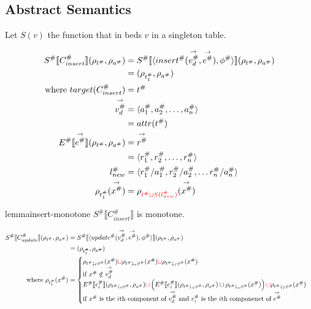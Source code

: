 \subsection{Abstract Semantics}

Let $S(v)$ the function that in beds $v$ in a singleton table.

\begin{align*}
    S^\# \llbracket C_{insert}^\# \rrbracket (\rho_{t^\#}, \rho_{a^\#})
    &= S^\# \llbracket \langle insert^\#(\overset{\rightarrow}{v_d^\#}, \overset{\rightarrow}{e^\#}), \phi^\# \rangle \rrbracket (\rho_{t^\#}, \rho_{a^\#}) \\
    &= (\rho_{t_1^\#}, \rho_{a^\#}) \\
    \text{where } target(C_{insert}^\#) &= t^\# \\
    \overset{\rightarrow}{v_d^\#} &= \langle a_1^\#, a_2^\#, \dots, a_n^\# \rangle \\
    &= attr(t^\#) \\
    E^\# \llbracket \overset{\rightarrow}{e^\#} \rrbracket (\rho_{t^\#}, \rho_{a^\#})
    &= \overset{\rightarrow}{r^\#} \\
    &= \langle r_1^\#, r_2^\#, \dots, r_n^\# \rangle \\
    l_{new}^\# &= \langle r_1^\#/a_1^\#, r_2^\#/a_2^\#, \dots r_n^\#/a_n^\# \rangle \\
    \rho_{t_1^\#}(\overset{\rightarrow}{x^\#}) &= \rho_{\textcolor{red}{t^\# \sqcup S(l_{new}^\#)}}(\overset{\rightarrow}{x^\#})
\end{align*}

\begin{restatable}{lemma}{insert-monotone}
    $S^\# \llbracket C_{insert}^\# \rrbracket$ is monotone.
\end{restatable}

\begin{align*}
    S^\# \llbracket C^\#_{update} \rrbracket(\rho_{t^\#}, \rho_{a^\#})
    &= S^\# \llbracket \langle update^\#(\overset{\rightarrow}{v_d^\#}, \overset{\rightarrow}{e^\#}), \phi^\# \rangle \rrbracket (\rho_{t^\#}, \rho_{a^\#}) \\
    &= (\rho_{t^\#_1}, \rho_{a^\#}) \\
    \text{where } \rho_{t^\#_1}(x^\#) &=
    \begin{cases}
        \rho_{t^\# \downarrow_t \phi^\#}(x^\#) \textcolor{red}{\sqcup} \rho_{t^\# \downarrow_u \phi^\#}(x^\#) \textcolor{red}{\sqcup} \rho_{t^\# \downarrow_f \phi^\#}(x^\#) \\
        \text{if } x^\# \notin \overset{\rightarrow}{v_d^\#} \\
        E^\# \llbracket e^\#_{i} \rrbracket(\rho_{t^\# \downarrow_t \phi^\#}, \rho_{a^\#}) \textcolor{red}{\sqcup}
        \left( E^\# \llbracket e^\#_{i} \rrbracket(\rho_{t^\# \downarrow_u \phi^\#}, \rho_{a^\#}) \sqcup \rho_{t^\# \downarrow_u \phi^\#}(x^\#) \right) \textcolor{red}{\sqcup} \rho_{t^\# \downarrow_f \phi^\#}(x^\#) \\
        \text{if $x^\#$ is the $i$th component of $\overset{\rightarrow}{v_d^\#}$ and $e^\#_{i}$ is the $i$th componenet of $\overset{\rightarrow}{e^\#}$} \\
    \end{cases}
\end{align*}

